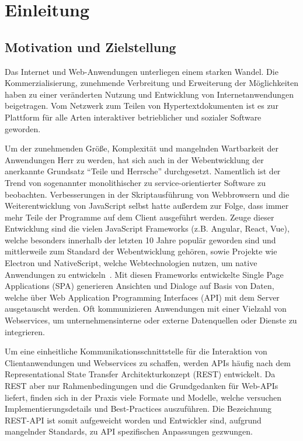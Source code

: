 \chapter{Einleitung}

\section{Motivation und Zielstellung}
Das Internet und Web-Anwendungen unterliegen einem starken Wandel.
Die Kommerzialisierung, zunehmende Verbreitung und Erweiterung der Möglichkeiten haben zu einer veränderten Nutzung und Entwicklung von Internetanwendungen beigetragen.
Vom Netzwerk zum Teilen von Hypertextdokumenten ist es zur Plattform für alle Arten interaktiver betrieblicher und sozialer Software geworden.
\par
Um der zunehmenden Größe, Komplexität und mangelnden Wartbarkeit der Anwendungen Herr zu werden, hat sich auch in der Webentwicklung der anerkannte Grundsatz \enquote{Teile und Herrsche} durchgesetzt.
Namentlich ist der Trend von sogenannter monolithischer zu service-orientierter Software zu beobachten.
Verbesserungen in der Skriptausführung von Webbrowsern und die Weiterentwicklung von JavaScript selbst hatte außerdem zur Folge, dass immer mehr Teile der Programme auf dem Client ausgeführt werden.
Zeuge dieser Entwicklung sind die vielen JavaScript Frameworks (z.B. Angular, React, Vue), welche besonders innerhalb der letzten 10 Jahre populär geworden sind und mittlerweile zum Standard der Webentwicklung gehören, sowie Projekte wie Electron und NativeScript, welche Webtechnologien nutzen, um native Anwendungen zu entwickeln~\cite[vgl.][]{SOsurvey}.
Mit diesen Frameworks entwickelte Single Page Applications (SPA) generieren Ansichten und Dialoge auf Basis von Daten, welche über Web Application Programming Interfaces (API) mit dem Server ausgetauscht werden.
Oft kommunizieren Anwendungen mit einer Vielzahl von Webservices, \zB{} um unternehmensinterne oder externe Datenquellen oder Dienste zu integrieren.
\par
Um eine einheitliche Kommunikationsschnittstelle für die Interaktion von Clientanwendungen und Webservices zu schaffen, werden APIs häufig nach dem Representational State Transfer Architekturkonzept (REST) entwickelt.
Da REST aber nur Rahmenbedingungen und die Grundgedanken für Web-APIs liefert, finden sich in der Praxis viele Formate und Modelle, welche versuchen Implementierungsdetails und Best-Practices auszuführen.
Die Bezeichnung REST-API ist somit aufgeweicht worden und Entwickler sind, aufgrund mangelnder Standards, zu API spezifischen Anpassungen gezwungen.
